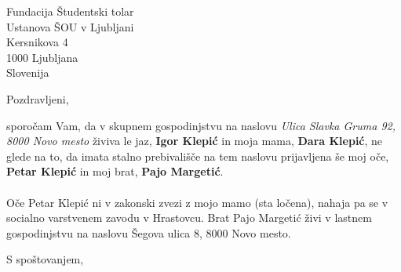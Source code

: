 \documentclass[a4paper]{scrlttr2}
\begin{document}
 
\begin{letter}{Fundacija Študentski tolar \\ Ustanova ŠOU v Ljubljani \\ Kersnikova 4 \\ 1000 Ljubljana \\ Slovenija}
 

\opening{Pozdravljeni,}
sporočam Vam, da v skupnem gospodinjstvu na naslovu \textit{Ulica Slavka Gruma 92, 8000 Novo mesto} živiva le jaz, \textbf{Igor Klepić} in moja mama, \textbf{Dara Klepić}, ne glede na to, da imata stalno prebivališče na tem naslovu prijavljena še moj oče, \textbf{Petar Klepić} in moj brat, \textbf{Pajo Margetić}.
\\
\\
Oče Petar Klepić ni v zakonski zvezi z mojo mamo (sta ločena), nahaja pa se v socialno varstvenem zavodu v Hrastovcu. Brat Pajo Margetić živi v lastnem gospodinjstvu na naslovu Šegova ulica 8, 8000 Novo mesto.
\closing{S spoštovanjem,}


 
\end{letter}
 
\end{document}
